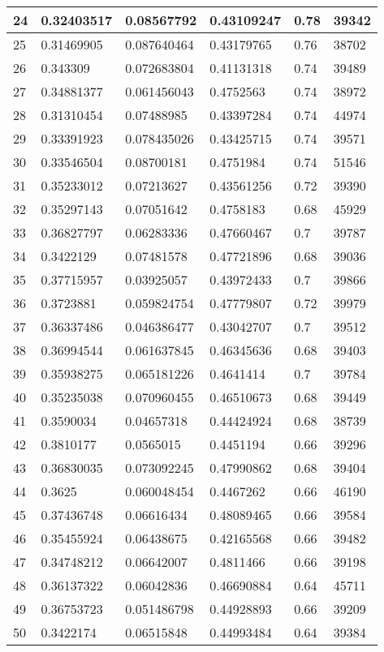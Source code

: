 \begin{longtable}{|l|l|l|l|l|l|}
24 & 0.32403517 & 0.08567792 & 0.43109247 & 0.78 & 39342 \\ \hline 
25 & 0.31469905 & 0.087640464 & 0.43179765 & 0.76 & 38702 \\ \hline 
26 & 0.343309 & 0.072683804 & 0.41131318 & 0.74 & 39489 \\ \hline 
27 & 0.34881377 & 0.061456043 & 0.4752563 & 0.74 & 38972 \\ \hline 
28 & 0.31310454 & 0.07488985 & 0.43397284 & 0.74 & 44974 \\ \hline 
29 & 0.33391923 & 0.078435026 & 0.43425715 & 0.74 & 39571 \\ \hline 
30 & 0.33546504 & 0.08700181 & 0.4751984 & 0.74 & 51546 \\ \hline 
31 & 0.35233012 & 0.07213627 & 0.43561256 & 0.72 & 39390 \\ \hline 
32 & 0.35297143 & 0.07051642 & 0.4758183 & 0.68 & 45929 \\ \hline 
33 & 0.36827797 & 0.06283336 & 0.47660467 & 0.7 & 39787 \\ \hline 
34 & 0.3422129 & 0.07481578 & 0.47721896 & 0.68 & 39036 \\ \hline 
35 & 0.37715957 & 0.03925057 & 0.43972433 & 0.7 & 39866 \\ \hline 
36 & 0.3723881 & 0.059824754 & 0.47779807 & 0.72 & 39979 \\ \hline 
37 & 0.36337486 & 0.046386477 & 0.43042707 & 0.7 & 39512 \\ \hline 
38 & 0.36994544 & 0.061637845 & 0.46345636 & 0.68 & 39403 \\ \hline 
39 & 0.35938275 & 0.065181226 & 0.4641414 & 0.7 & 39784 \\ \hline 
40 & 0.35235038 & 0.070960455 & 0.46510673 & 0.68 & 39449 \\ \hline 
41 & 0.3590034 & 0.04657318 & 0.44424924 & 0.68 & 38739 \\ \hline 
42 & 0.3810177 & 0.0565015 & 0.4451194 & 0.66 & 39296 \\ \hline 
43 & 0.36830035 & 0.073092245 & 0.47990862 & 0.68 & 39404 \\ \hline 
44 & 0.3625 & 0.060048454 & 0.4467262 & 0.66 & 46190 \\ \hline 
45 & 0.37436748 & 0.06616434 & 0.48089465 & 0.66 & 39584 \\ \hline 
46 & 0.35455924 & 0.06438675 & 0.42165568 & 0.66 & 39482 \\ \hline 
47 & 0.34748212 & 0.06642007 & 0.4811466 & 0.66 & 39198 \\ \hline 
48 & 0.36137322 & 0.06042836 & 0.46690884 & 0.64 & 45711 \\ \hline 
49 & 0.36753723 & 0.051486798 & 0.44928893 & 0.66 & 39209 \\ \hline 
50 & 0.3422174 & 0.06515848 & 0.44993484 & 0.64 & 39384 \\ \hline 
\end{longtable}